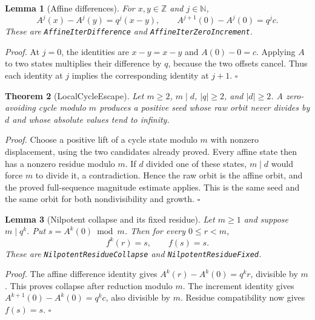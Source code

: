 \documentclass[11pt,letterpaper]{article}
\newcommand{\N}{\mathbb{N}}
\newcommand{\Z}{\mathbb{Z}}
\newtheorem{theorem}{Theorem}
\newtheorem{lemma}[theorem]{Lemma}
\newenvironment{proof}{\noindent\textit{Proof.}}{\hfill\(\square\)}
\begin{document}
\begin{lemma}[Affine differences]
For \(x,y\in\Z\) and \(j\in\N\),
\[
 A^j(x)-A^j(y)=q^j(x-y),\qquad
 A^{j+1}(0)-A^j(0)=q^j c.
\]
These are \texttt{Affine\allowbreak Iter\allowbreak Difference} and
\texttt{Affine\allowbreak Iter\allowbreak Zero\allowbreak Increment}.
\end{lemma}

\begin{proof}
At \(j=0\), the identities are \(x-y=x-y\) and
\(A(0)-0=c\). Applying \(A\) to two states multiplies their
difference by \(q\), because the two offsets cancel. Thus each
identity at \(j\) implies the corresponding identity at \(j+1\).
\end{proof}

\begin{theorem}[LocalCycleEscape]
Let \(m\ge2\), \(m\mid d\), \(|q|\ge2\), and \(|d|\ge2\).
A zero-avoiding cycle modulo \(m\) produces a positive seed whose
raw orbit never divides by \(d\) and whose absolute values tend
to infinity.
\end{theorem}

\begin{proof}
Choose a positive lift of a cycle state modulo \(m\) with nonzero
 displacement, using the two candidates already proved. Every affine
state then has a nonzero residue modulo \(m\). If \(d\) divided
one of these states, \(m\mid d\) would force \(m\) to divide it,
a contradiction. Hence the raw orbit is the affine orbit, and the
proved full-sequence magnitude estimate applies. This is the same
seed and the same orbit for both nondivisibility and growth.
\end{proof}

\begin{lemma}[Nilpotent collapse and its fixed residue]
Let \(m\ge1\) and suppose \(m\mid q^k\). Put
\(s=A^k(0)\bmod m\). Then for every \(0\le r<m\),
\[
 f^k(r)=s,\qquad f(s)=s.
\]
These are \texttt{Nilpotent\allowbreak Residue\allowbreak Collapse} and
\texttt{Nilpotent\allowbreak Residue\allowbreak Fixed}.
\end{lemma}

\begin{proof}
The affine difference identity gives
\(A^k(r)-A^k(0)=q^k r\), divisible by \(m\). This proves
collapse after reduction modulo \(m\). The increment identity gives
\(A^{k+1}(0)-A^k(0)=q^k c\), also divisible by \(m\).
Residue compatibility now gives \(f(s)=s\).
\end{proof}
\end{document}
